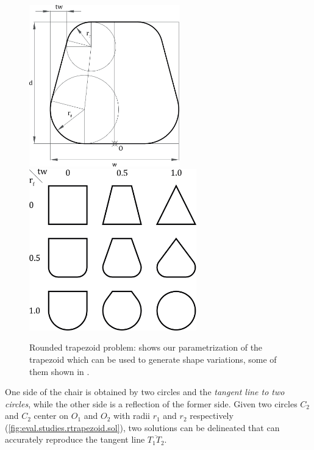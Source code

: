 \begin{figure}[htb]
    {\includegraphics[height=7cm]{fig/rtrapezoid-problem-params}}
  \hfill
    {\includegraphics[height=7cm]{fig/rtrapezoid-problem-vars}}
  \caption[Rounded trapezoid problem]{Rounded trapezoid problem:
     shows our parametrization
    of the trapezoid which can be used to generate shape variations, some of
    them shown in .}%
  \label{fig:eval.studies.rtrapezoid.prob}
\end{figure}

One side of the chair is obtained by two circles and the \textit{tangent line
to two circles}, while the other side is a reflection of the former side.  Given
two circles $C_2$ and $C_2$ center on $O_1$ and $O_2$ with radii $r_1$ and $r_2$
respectively (\cref{fig:eval.studies.rtrapezoid.sol}), two solutions can be
delineated that can accurately reproduce the tangent line $\overline{T_1 T_2}$.

